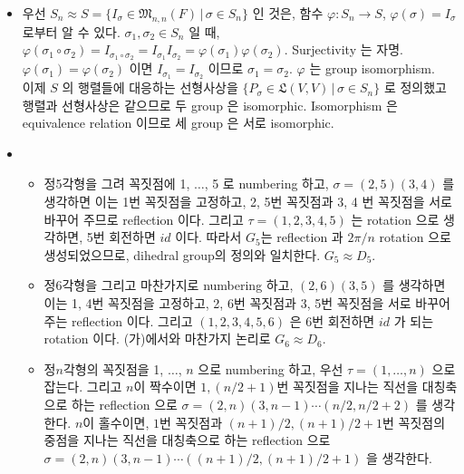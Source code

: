 \documentclass[12pt]{report}
\newcommand{\numl}[1]{\item[\large\textbf{\sffamily #1}]}
\newcommand{\num}[1]{\item[\textbf{\sffamily #1}]}
\newcommand{\mf}[1]{\mathfrak{#1}}
\begin{document}
\begin{itemize}
\numl{11.9.21} 우선 $S_n \approx S = \{I_\sigma \in \mf{M}_{n, n}(F) \, | \, \sigma \in S_n\}$ 인 것은, 함수 $\varphi: S_n \rightarrow S$, $\varphi(\sigma) = I_\sigma$ 로부터 알 수 있다. $\sigma_1, \sigma_2\in S_n$ 일 때,
$\varphi(\sigma_1 \circ \sigma_2) = I_{\sigma_1\circ\sigma_2} = I_{\sigma_1}I_{\sigma_2} = \varphi(\sigma_1)\varphi(\sigma_2)$. Surjectivity 는 자명. $\varphi(\sigma_1)=\varphi(\sigma_2)$ 이면 $I_{\sigma_1}=I_{\sigma_2}$ 이므로 $\sigma_1 = \sigma_2$. $\varphi$ 는 group isomorphism.\\
이제 $S$ 의 행렬들에 대응하는 선형사상을 $\{P_\sigma \in \mf{L}(V, V) \, | \, \sigma \in S_n\}$ 로 정의했고 행렬과 선형사상은 같으므로 두 group 은 isomorphic. Isomorphism 은 equivalence relation 이므로 세 group 은 서로 isomorphic.

\numl{11.9.25} 
	\begin{itemize}
		\num{(가)} 정5각형을 그려 꼭짓점에 1, $\dots$, 5 로 numbering 하고, $\sigma = (2, 5)(3, 4)$ 를 생각하면 이는 1번 꼭짓점을 고정하고, 2, 5번 꼭짓점과 3, 4 번 꼭짓점을 서로 바꾸어 주므로 reflection 이다. 그리고 $\tau = (1, 2, 3, 4, 5)$ 는 rotation 으로 생각하면, 5번 회전하면 $id$ 이다. 따라서 $G_5$는 reflection 과 $2\pi/n$ rotation 으로 생성되었으므로, dihedral group의 정의와 일치한다. $G_5\approx D_5$.
		\num{(나)} 정6각형을 그리고 마찬가지로 numbering 하고, $(2, 6)(3, 5)$ 를 생각하면 이는 1, 4번 꼭짓점을 고정하고, 2, 6번 꼭짓점과 3, 5번 꼭짓점을 서로 바꾸어 주는 reflection 이다. 그리고 $(1, 2, 3, 4, 5, 6)$ 은 6번 회전하면 $id$ 가 되는 rotation 이다. (가)에서와 마찬가지 논리로 $G_6\approx D_6$.
		\num{(다)} 정$n$각형의 꼭짓점을 1, $\dots$, $n$ 으로 numbering 하고, 우선 $\tau = (1, \dots, n)$ 으로 잡는다. 그리고 $n$이 짝수이면 $1, (n/2+1)$번 꼭짓점을 지나는 직선을 대칭축으로 하는 reflection 으로 $\sigma = (2, n)(3, n-1)\cdots(n/2, n/2+2)$ 를 생각한다. $n$이 홀수이면, $1$번 꼭짓점과 $(n+1)/2, (n+1)/2+1$번 꼭짓점의 중점을 지나는 직선을 대칭축으로 하는 reflection 으로 $\sigma = (2, n)(3, n-1)\cdots((n+1)/2, (n+1)/2+1)$ 을 생각한다.
	\end{itemize}


\end{itemize}
\end{document}
